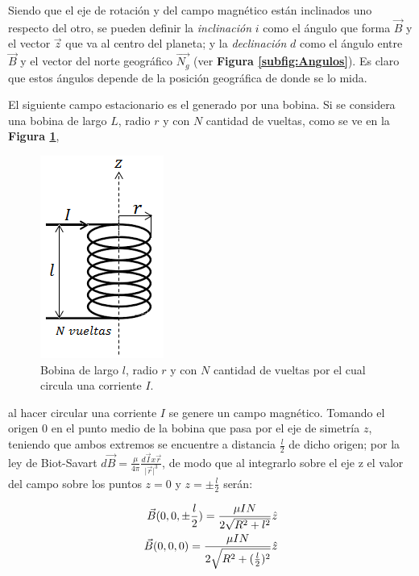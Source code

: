 \documentclass[11pt,a4paper]{article}
\begin{document}
Siendo que el eje de rotación y del campo magnético están inclinados uno respecto del otro, se pueden definir la \textit{inclinación} $i$ como el ángulo que forma $\vec{B}$ y el vector $\vec{z}$ que va al centro del planeta; y la \textit{declinación} $d$ como el ángulo entre $\vec{B}$ y el vector del norte geográfico $\vec{N_g}$ (ver \textbf{ Figura \ref{subfig:Angulos}}). Es claro que estos ángulos depende de la posición geográfica de donde se lo mida.

\bigskip
El siguiente campo estacionario es el generado por una bobina. Si se considera una bobina de largo $L$, radio $r$ y con $N$ cantidad de vueltas, como se ve en la \textbf{Figura \ref{fig:bobina_intro}},

\begin{figure}[h]

\centering
\includegraphics[scale=1]{bobina.png}
	\caption{Bobina de largo $l$, radio $r$ y con $N$ cantidad de vueltas por el cual circula una corriente $I$.}
	\label{fig:bobina_intro}
\end{figure}

al hacer circular una corriente $I$ se genere un campo magnético. Tomando el origen $0$ en el punto medio de la bobina que pasa por el eje de simetría $z$, teniendo que ambos extremos se encuentre a distancia $\frac{l}{2}$ de dicho origen; por la ley de Biot-Savart $d\vec{B}=\frac{\mu}{4\pi}\frac{d\vec{I}x\vec{r}}{\vert\vec{r}\vert^3}$, de modo que al integrarlo sobre el eje z el valor del campo sobre los puntos $z=0$ y $z=\pm \frac{l}{2}$ serán:

\begin{equation}{\label{eq:valores_B}}
\begin{split}
\vec{B}(0,0, \pm \frac{l}{2})= \frac{\mu I N}{2\sqrt{R^2+l^2}}\hat{z}\\
\vec{B}(0,0,0)= \frac{\mu I N}{2\sqrt{R^2+(\frac{l}{2})^2}}\hat{z}
\end{split}
\end{equation}
\end{document}
